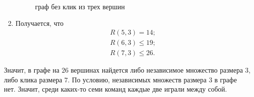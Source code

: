 \begin{solution}
\begin{enumerate}
\begin{figure}[H]
\begin{subfigure}[a]{0.24\linewidth}
  \end{subfigure}
  \caption{граф без клик из трех вершин}
\end{figure}

\item
Получается, что
\begin{gather*}
    R(5, 3) = 14;\\
    R(6, 3) \leq 19;\\
    R(7, 3) \leq 26.
\end{gather*}
\end{enumerate}
Значит, в графе на $26$ вершинах найдется либо независимое множество размера $3$, либо клика размера $7$. По условию, независимых множеств размера $3$ в графе нет. Значит, среди каких-то семи команд каждые две играли между собой.
\end{solution}